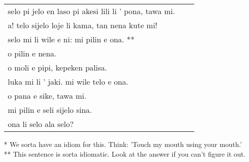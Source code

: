 \begin{supertabular}{p{5,5cm}|ll}
    selo pi jelo en laso pi akesi lili li ' pona, tawa mi. &  & \\ %
    a! telo sijelo loje li kama, tan nena kute mi!         &  & \\ %
    selo mi li wile e ni: mi pilin e ona. **               &  & \\ %
    o pilin e nena.                                        &  & \\ %
    o moli e pipi, kepeken palisa.                         &  & \\ %
    luka mi li ' jaki. mi wile telo e ona.                 &  & \\ %
    o pana e sike, tawa mi.                                &  & \\ %
    mi pilin e seli sijelo sina.                           &  & \\ %
    ona li selo ala selo?                                  &  & \\ %
\end{supertabular}

* We sorta have an idiom for this.
Think: 'Touch my mouth using your mouth.' \\
** This sentence is sorta idiomatic.
Look at the answer if you can't figure it out.
%

